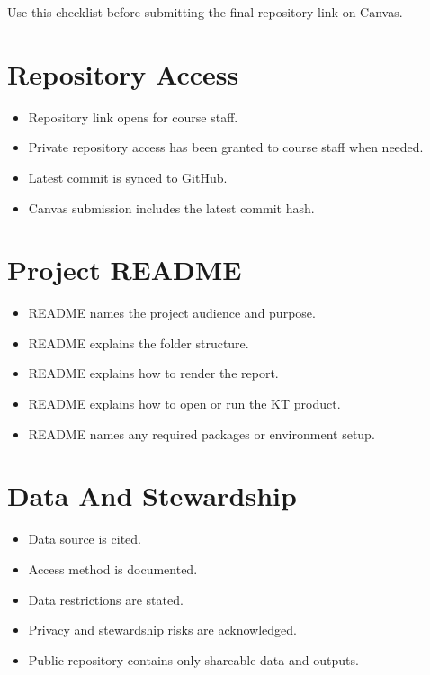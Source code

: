 \documentclass[
  letterpaper,
  DIV=11,
  numbers=noendperiod,
  oneside]{scrreprt}
\providecommand{\tightlist}{%
  \setlength{\itemsep}{0pt}\setlength{\parskip}{0pt}}
\begin{document}
Use this checklist before submitting the final repository link on
Canvas.

\section{Repository Access}\label{repository-access}

\begin{itemize}
\tightlist
\item[$\square$]
  Repository link opens for course staff.
\item[$\square$]
  Private repository access has been granted to course staff when
  needed.
\item[$\square$]
  Latest commit is synced to GitHub.
\item[$\square$]
  Canvas submission includes the latest commit hash.
\end{itemize}

\section{Project README}\label{project-readme}

\begin{itemize}
\tightlist
\item[$\square$]
  README names the project audience and purpose.
\item[$\square$]
  README explains the folder structure.
\item[$\square$]
  README explains how to render the report.
\item[$\square$]
  README explains how to open or run the KT product.
\item[$\square$]
  README names any required packages or environment setup.
\end{itemize}

\section{Data And Stewardship}\label{data-and-stewardship}

\begin{itemize}
\tightlist
\item[$\square$]
  Data source is cited.
\item[$\square$]
  Access method is documented.
\item[$\square$]
  Data restrictions are stated.
\item[$\square$]
  Privacy and stewardship risks are acknowledged.
\item[$\square$]
  Public repository contains only shareable data and outputs.
\end{itemize}
\end{document}
